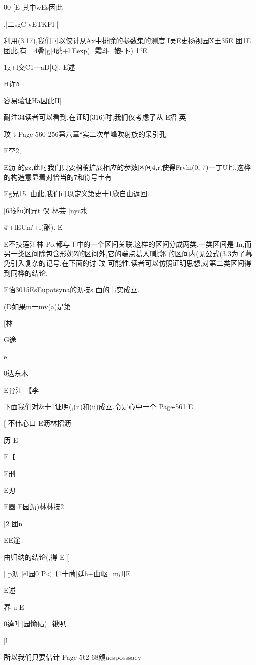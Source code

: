 {{00
[E
其中wEs因此

,|二sgC-vETKFI
[

利用(3.17),我们可以佼计从Ax中排除的参数集的测度
I吴E史扬视园X王35E
团1E
团此,有
_4叠|g|4蘑+l|Eexp(_霜斗_媲-卜)
1“E

1g+l交C1一aD|Q|.
E述

H许5

容易验证Ha因此II[

耐注34读者可以看到,在证明(316)时,我们仅考虑了从
E招
英

玟
t
Page-560
256第六章“实二次单峰吹射族的呆引孔

E李2,

E沥
的gz,此时我们只要稍稍扩展相应的参数区间4,r,使得Frvhi(0,
7)一丁U匕.这桦的构造意显着对恰当的7和符号土有

Eg兄15[
由此,我们可以定义第史十1欣自由返回.

[63述u河异t
仪
林芸
[nyc水

4′+lEUm′+l(酗).
E

E不技莲江林
Po,都与工中的一个区间关联.这样的区间分成两类,一类区间是
In,而另一类区间除包含形奶Z的区间外,它的端点葛入I毗邻
的区间内(见公式(3.3为了暮免引入复杂的记号,在下面的讨
玟
可能性.读者可以仿照证明思想,对第二类区间得到同桦的结论.

E怡3015EsEupotsyna的沥技s
面的事实成立.

(D如果m一mv(a)是第%

[林

G途

e

0达东木

E育江
【李

下面我们对&十1证明(,(ii)和(ii)成立.令是心中一个
Page-561
E

[
不伟心口
E沥林招沥

历
E

E【

E刑

E刃

E圆
E园沥)林林技2

[2
团n

EE途

由归纳的结论(,得
E
[

[
p沥
|el园0
P<〔1十茼]廷h+曲岖_m川E

E述

春
u
E

0逵叶]园愉砧)_锹叭‖

[l

所以我们只要佶计
Page-562
68颜uesposssaey

}}
